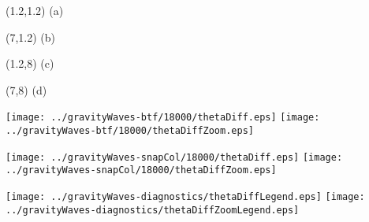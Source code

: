 \documentclass{article}
\begin{document}
\TPMargin{3pt}
\begin{textblock}{0.75}(1.2,1.2)
\normalsize
\centering
(a)
\end{textblock}
\begin{textblock}{0.75}(7,1.2)
\normalsize
\centering
(b)
\end{textblock}
\begin{textblock}{0.75}(1.2,8)
\normalsize
\centering
(c)
\end{textblock}
\begin{textblock}{0.75}(7,8)
\normalsize
\centering
(d)
\end{textblock}
\texttt{[image: ../gravityWaves-btf/18000/thetaDiff.eps]}
\hspace{0.1in}
\texttt{[image: ../gravityWaves-btf/18000/thetaDiffZoom.eps]}
\vspace*{0.1in}

\texttt{[image: ../gravityWaves-snapCol/18000/thetaDiff.eps]}
\hspace{0.1in}
\texttt{[image: ../gravityWaves-snapCol/18000/thetaDiffZoom.eps]}
\vspace*{0.1in}

\texttt{[image: ../gravityWaves-diagnostics/thetaDiffLegend.eps]}
\hspace{0.2in}
\texttt{[image: ../gravityWaves-diagnostics/thetaDiffZoomLegend.eps]}
\end{document}
